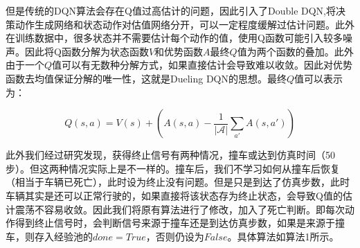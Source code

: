 \documentclass[letterpaper, 10 pt, conference]{ieeeconf}  %
\begin{document}
但是传统的DQN算法会存在Q值过高估计的问题，因此引入了Double DQN\cite{van2016deep},将决策动作生成网络和状态动作对估值网络分开，可以一定程度缓解过估计问题。此外在训练数据中，很多状态并不需要估计每个动作的值，使用Q函数可能引入较多噪声。因此将Q函数分解为状态函数$V$和优势函数$A$最终$Q$值为两个函数的叠加。此外由于一个$Q$值可以有无数种分解方式，如果直接估计会导致难以收敛。因此对优势函数去均值保证分解的唯一性，这就是Dueling DQN\cite{wang2016dueling}的思想。最终$Q$值可以表示为：

\begin{equation}
    Q(s,a) = V(s)+(A(s,a)-\frac{1}{|\mathcal{A}|}\sum_{a'}A(s,a'))    
\end{equation}



此外我们经过研究发现，获得终止信号有两种情况，撞车或达到仿真时间（50步）。但这两种情况实际上是不一样的。撞车后，我们不学习如何从撞车后恢复（相当于车辆已死亡），此时设为终止没有问题。但是只是到达了仿真步数，此时车辆其实是还可以正常行驶的，如果直接将该状态存为终止状态，会导致Q值的估计震荡不容易收敛。因此我们将原有算法进行了修改，加入了死亡判断。即每次动作得到终止信号时，会判断信号来源于撞车还是到达仿真步数，如果是来源于撞车，则存入经验池的$done=True$，否则仍设为$False$。具体算法如算法1所示。

\end{document}
